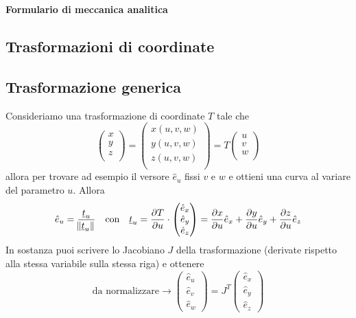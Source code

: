 \documentclass[11pt,landscape]{article}
\begin{document}
\raggedright
\footnotesize

\begin{center}
     \Large{\textbf{Formulario di meccanica analitica}} \\
\end{center}
\begin{multicols}{3}
\setlength{\premulticols}{1pt}
\setlength{\postmulticols}{1pt}
\setlength{\multicolsep}{1pt}
\setlength{\columnsep}{2pt}

\renewcommand{\vec}[1]{\underline{#1}}
\newcommand{\e}[0]{\hat{e}}
\newcommand{\de}[2]{\frac{\partial #1}{\partial #2}}

\section{Trasformazioni di coordinate}
    \subsection{Trasformazione generica}
        Consideriamo una trasformazione di coordinate $T$ tale che 
        $$ \begin{pmatrix}
            x\\
            y\\
            z\\
        \end{pmatrix}
        = 
        \begin{pmatrix}
            x(u,v,w)\\
            y(u,v,w)\\
            z(u,v,w)\\
        \end{pmatrix}
        = T \begin{pmatrix}
            u\\ v\\ w\\
            \end{pmatrix}
        $$
        allora per trovare ad esempio il versore $\e_u$ fissi $v$ e $w$ e ottieni una curva al variare del parametro $u$. Allora 
        $$ \e_u = \frac{\vec{t}_u}{\norm{\vec{t}_u}} \quad \text{con} \quad \vec{t}_u = \frac{\partial T}{\partial u} \cdot \begin{pmatrix} \hat{e}_x\\ \hat{e}_y \\ \hat{e}_z \end{pmatrix} = \de{x}{u} \e_x + \de{y}{u} \e_y + \de{z}{u} \e_z$$
        In sostanza puoi scrivere lo Jacobiano $J$ della trasformazione (derivate rispetto alla stessa variabile sulla stessa riga) e ottenere
        $$ \text{da normalizzare}\longrightarrow \begin{pmatrix}
            \e_u\\ \e_v\\ \e_w
        \end{pmatrix} = J^T
        \begin{pmatrix}
            \e_x \\\e_y\\\e_z
        \end{pmatrix}$$

\end{multicols}
\end{document}
